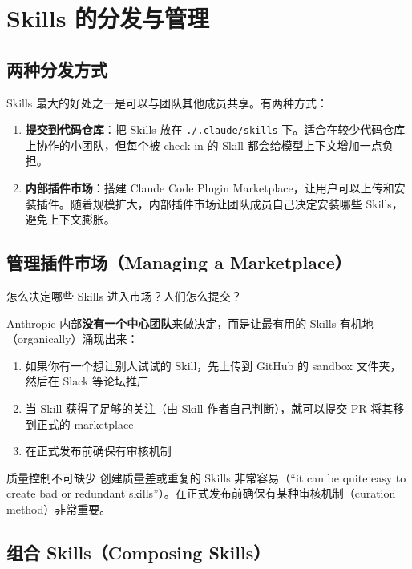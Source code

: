\section{Skills 的分发与管理}

\subsection{两种分发方式}

Skills 最大的好处之一是可以与团队其他成员共享。有两种方式：

\begin{enumerate}
    \item \textbf{提交到代码仓库}：把 Skills 放在 \texttt{./.claude/skills} 下。适合在较少代码仓库上协作的小团队，但每个被 check in 的 Skill 都会给模型上下文增加一点负担。
    \item \textbf{内部插件市场}：搭建 Claude Code Plugin Marketplace，让用户可以上传和安装插件。随着规模扩大，内部插件市场让团队成员自己决定安装哪些 Skills，避免上下文膨胀。
\end{enumerate}

\subsection{管理插件市场（Managing a Marketplace）}

怎么决定哪些 Skills 进入市场？人们怎么提交？

Anthropic 内部\textbf{没有一个中心团队}来做决定，而是让最有用的 Skills 有机地（organically）涌现出来：

\begin{enumerate}
    \item 如果你有一个想让别人试试的 Skill，先上传到 GitHub 的 sandbox 文件夹，然后在 Slack 等论坛推广
    \item 当 Skill 获得了足够的关注（由 Skill 作者自己判断），就可以提交 PR 将其移到正式的 marketplace
    \item 在正式发布前确保有审核机制
\end{enumerate}

\begin{warningbox}{质量控制不可缺少}
创建质量差或重复的 Skills 非常容易（``it can be quite easy to create bad or redundant skills''）。在正式发布前确保有某种审核机制（curation method）非常重要。
\end{warningbox}

\subsection{组合 Skills（Composing Skills）}


